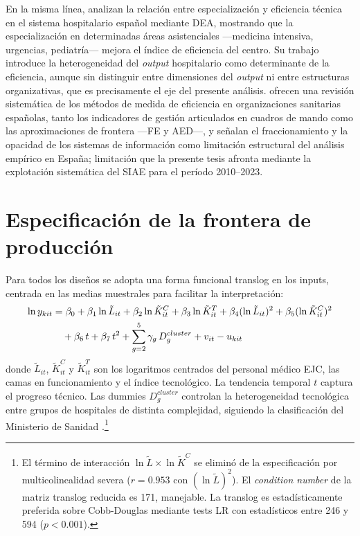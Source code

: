 En la misma línea, \citet{rodriguez_sanchez2004} analizan la relación entre especialización y eficiencia técnica en el sistema hospitalario español mediante DEA, mostrando que la especialización en determinadas áreas asistenciales ---medicina intensiva, urgencias, pediatría--- mejora el índice de eficiencia del centro. Su trabajo introduce la heterogeneidad del \textit{output} hospitalario como determinante de la eficiencia, aunque sin distinguir entre dimensiones del \textit{output} ni entre estructuras organizativas, que es precisamente el eje del presente análisis. \citet{martin2007medida} ofrecen una revisión sistemática de los métodos de medida de eficiencia en organizaciones sanitarias españolas, tanto los indicadores de gestión articulados en cuadros de mando como las aproximaciones de frontera ---FE y AED---, y señalan el fraccionamiento y la opacidad de los sistemas de información como limitación estructural del análisis empírico en España; limitación que la presente tesis afronta mediante la explotación sistemática del SIAE para el período 2010--2023.

\section{Especificación de la frontera de producción}

Para todos los diseños se adopta una forma funcional translog en los inputs, centrada en las medias muestrales para facilitar la interpretación:
\begin{align}
  \ln y_{kit} &= \beta_0
    + \beta_1 \ln\tilde{L}_{it}
    + \beta_2 \ln\tilde{K}^C_{it}
    + \beta_3 \ln\tilde{K}^T_{it}
    + \beta_4 (\ln\tilde{L}_{it})^2
    + \beta_5 (\ln\tilde{K}^C_{it})^2
    \notag \\
    &\quad
    + \beta_6\, t
    + \beta_7\, t^2
    + \sum_{g=2}^{5} \gamma_g\, D^{cluster}_g
    + v_{it} - u_{kit}
  \label{eq:frontera_tl}
\end{align}
donde $\tilde{L}_{it}$, $\tilde{K}^C_{it}$ y $\tilde{K}^T_{it}$ son los logaritmos centrados del personal médico EJC, las camas en funcionamiento y el índice tecnológico. La tendencia temporal $t$ captura el progreso técnico. Las dummies $D^{cluster}_g$ controlan la heterogeneidad tecnológica entre grupos de hospitales de distinta complejidad, siguiendo la clasificación del Ministerio de Sanidad \citep{ministerio2007}.\footnote{El término de interacción $\ln\tilde{L}\times\ln\tilde{K}^C$ se eliminó de la especificación por multicolinealidad severa ($r=0.953$ con $(\ln\tilde{L})^2$). El \textit{condition number} de la matriz translog reducida es 171, manejable. La translog es estadísticamente preferida sobre Cobb-Douglas mediante tests LR con estadísticos entre 246 y 594 ($p<0.001$).}

